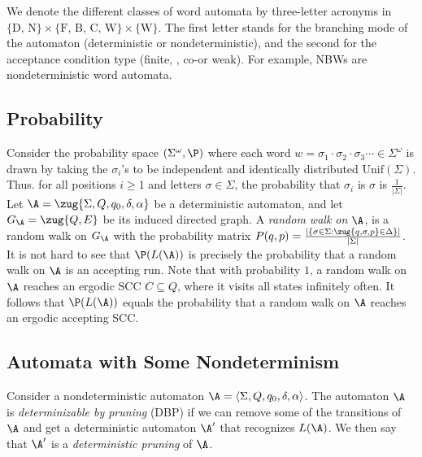 \documentclass{lmcs}
\begin{document}
We denote the different classes of word automata by three-letter acronyms in $\{ \text{D, N} \} \times \{ \text{F, B, C, W}\} \times \{\text{W}\}$. The first letter stands for the branching mode of the automaton (deterministic or nondeterministic), and  the second for the acceptance condition type (finite, \buchi, co-\buchi or weak). For example, NBWs are nondeterministic \buchi word automata. 



\subsection{Probability}
Consider the probability space $(\Sigma^\omega,\P)$ where each word $w=\sigma_1\cdot \sigma_2 \cdot \sigma_3\cdots \in \Sigma^\omega$ is drawn by taking the $\sigma_i$'s to be independent and identically distributed $\mathrm{Unif}(\Sigma)$. Thus. for all positions $i \geq 1$ and letters $\sigma \in \Sigma$, the probability that  $\sigma_i$ is $\sigma$ is $\frac{1}{|\Sigma|}$. Let $\A=\zug{\Sigma,Q,q_0,\delta,\alpha}$ be a deterministic automaton, and let $G_\A=\zug{Q,E}$ be its  induced directed graph. A \emph{random walk on $\A$}, is a random walk on $G_\A$ with the probability matrix $P(q,p)=\frac{|\{\sigma\in \Sigma : \zug{q,\sigma,p}\in \Delta\} |}{|\Sigma|}$. It is not hard to see that $\P(L(\A))$ is precisely the probability that a random walk on $\A$ is an accepting run. Note that with probability $1$, a random walk on $\A$ reaches an ergodic SCC $C\subseteq Q$, where it visits all states infinitely often. It follows that $\P(L(\A))$ equals the probability that a random walk on $\A$ reaches an ergodic accepting SCC.


\subsection{Automata with Some Nondeterminism}
\label{awsn}

Consider a nondeterministic automaton $\A = \langle \Sigma, Q, q_0, \delta, \alpha  \rangle$.
The automaton $\A$ is {\em determinizable by pruning} (DBP) if we can remove some of the transitions of $\A$ and get a deterministic automaton $\A'$ that recognizes $L(\A)$.  We then say that $\A'$ is a {\em deterministic pruning\/} of $\A$. 
\end{document}
